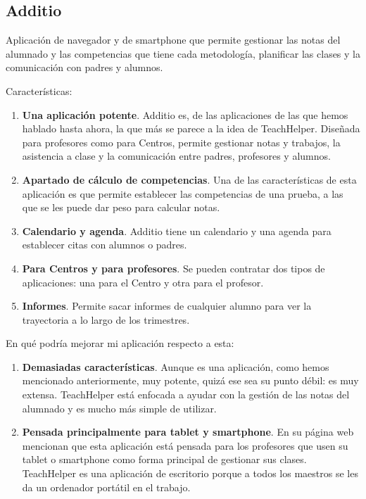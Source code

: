 \subsection{Additio}

Aplicación de navegador y de smartphone que permite gestionar las notas del alumnado y las competencias que tiene cada metodología, planificar las clases y la comunicación con padres y alumnos.

Características:

\begin{enumerate}
	\item \textbf{Una aplicación potente}. Additio es, de las aplicaciones de las que hemos hablado hasta ahora, la que más se parece a la idea de TeachHelper. Diseñada para profesores como para Centros, permite gestionar notas y trabajos, la asistencia a clase y la comunicación entre padres, profesores y alumnos. 
	\item \textbf{Apartado de cálculo de competencias}. Una de las características de esta aplicación es que permite establecer las competencias de una prueba, a las que se les puede dar peso para calcular notas.
	\item \textbf{Calendario y agenda}. Additio tiene un calendario y una agenda para establecer citas con alumnos o padres.
	\item \textbf{Para Centros y para profesores}. Se pueden contratar dos tipos de aplicaciones: una para el Centro y otra para el profesor.
	\item \textbf{Informes}. Permite sacar informes de cualquier alumno para ver la trayectoria a lo largo de los trimestres.
\end{enumerate}

En qué podría mejorar mi aplicación respecto a esta:

\begin{enumerate}
	\item \textbf{Demasiadas características}. Aunque es una aplicación, como hemos mencionado anteriormente, muy potente, quizá ese sea su punto débil: es muy extensa. TeachHelper está enfocada a ayudar con la gestión de las notas del alumnado y es mucho más simple de utilizar.
	\item \textbf{Pensada principalmente para tablet y smartphone}. En su página web mencionan que esta aplicación está pensada para los profesores que usen su tablet o smartphone como forma principal de gestionar sus clases. TeachHelper es una aplicación de escritorio porque a todos los maestros se les da un ordenador portátil en el trabajo.

\end{enumerate}